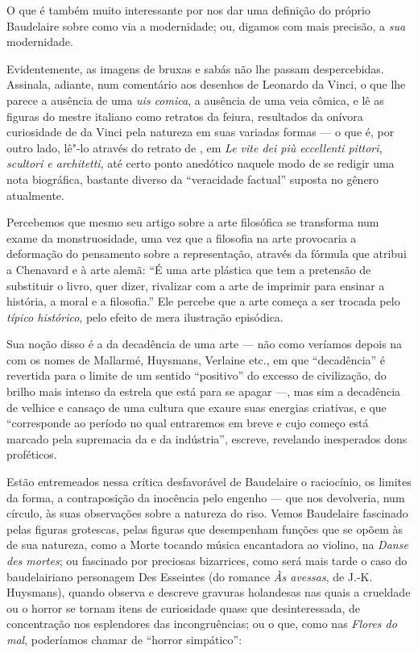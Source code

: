 O que é também muito interessante por nos dar uma definição do próprio
Baudelaire sobre como via a modernidade; ou, digamos com mais precisão,
a \textit{sua} modernidade.

Evidentemente, as imagens de bruxas e sabás não lhe passam
despercebidas. Assinala, adiante, num comentário aos desenhos de Leonardo da
Vinci, o que lhe parece a ausência de uma \textit{uis comica}, a
ausência de uma veia cômica, e lê as figuras do mestre italiano como
retratos da feiura, resultados da onívora curiosidade de da Vinci pela
natureza em suas variadas formas --- o que é, por outro lado, lê"-lo
através do retrato de , em \textit{Le vite dei più eccellenti
pittori, scultori e architetti}, até certo ponto anedótico naquele modo
de se redigir uma nota biográfica, bastante diverso da “veracidade
factual” suposta no gênero atualmente.

Percebemos que mesmo seu artigo sobre a arte filosófica se transforma
num exame da monstruosidade, uma vez que a filosofia na arte provocaria
a deformação do pensamento sobre a representação, através da fórmula
que atribui a Chenavard e à arte alemã: “É uma arte plástica que tem a
pretensão de substituir o livro, quer dizer, rivalizar com a arte de
imprimir para ensinar a história, a moral e a filosofia.” Ele percebe
que a arte começa a ser trocada pelo \textit{típico histórico}, pelo
efeito de mera ilustração episódica. 

Sua noção disso é a da decadência de uma arte --- não como
veríamos depois na  com os nomes de Mallarmé, Huysmans, Verlaine
etc., em que “decadência” é revertida para o limite de um sentido
“positivo” do excesso de civilização, do brilho mais intenso da estrela
que está para se apagar ---, mas sim a decadência de velhice e cansaço
de uma cultura que exaure suas energias criativas, e que “corresponde
ao período no qual entraremos em breve e cujo começo está marcado pela
supremacia da  e da indústria”, escreve, revelando inesperados
dons proféticos.

Estão entremeados nessa crítica desfavorável de Baudelaire o
raciocínio, os limites da forma, a contraposição da inocência pelo
engenho --- que nos devolveria, num círculo, às suas observações sobre
a natureza do riso. Vemos Baudelaire fascinado pelas figuras grotescas,
pelas figuras que desempenham funções que se opõem às de sua natureza,
como a Morte tocando música encantadora ao violino, na \textit{Danse
des mortes}; ou fascinado por preciosas bizarrices, como será mais
tarde o caso do baudelairiano personagem Des Esseintes (do romance
\textit{Às avessas}, de J.-K. Huysmans), quando observa e descreve
gravuras holandesas nas quais a crueldade ou o horror se tornam itens
de curiosidade quase que desinteressada, de concentração nos
esplendores das incongruências; ou o que, como nas \textit{Flores do mal}, 
poderíamos chamar de “horror simpático”:

